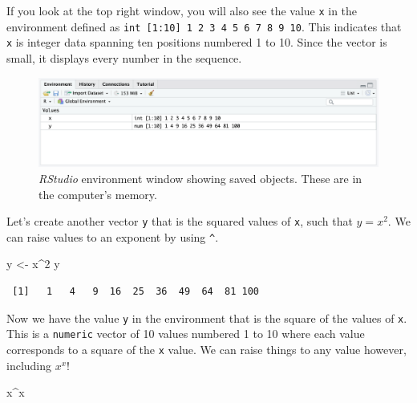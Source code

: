 \documentclass[
  letterpaper,
  DIV=11,
  numbers=noendperiod]{scrreprt}
\newenvironment{Shaded}{\begin{snugshade}}{\end{snugshade}}
\newcommand{\DecValTok}[1]{\textcolor[rgb]{0.68,0.00,0.00}{#1}}
\newcommand{\NormalTok}[1]{\textcolor[rgb]{0.00,0.23,0.31}{#1}}
\newcommand{\OtherTok}[1]{\textcolor[rgb]{0.00,0.23,0.31}{#1}}
\newcommand{\SpecialCharTok}[1]{\textcolor[rgb]{0.37,0.37,0.37}{#1}}
\begin{document}
If you look at the top right window, you will also see the value
\texttt{x} in the environment defined as
\texttt{int\ {[}1:10{]}\ 1\ 2\ 3\ 4\ 5\ 6\ 7\ 8\ 9\ 10}. This indicates
that \texttt{x} is integer data spanning ten positions numbered 1 to 10.
Since the vector is small, it displays every number in the sequence.

\begin{figure}[H]

{\centering \includegraphics{images/environment.png}

}

\caption{\emph{RStudio} environment window showing saved objects. These
are in the computer's memory.}

\end{figure}%

Let's create another vector \texttt{y} that is the squared values of
\texttt{x}, such that \(y=x^2\). We can raise values to an exponent by
using \texttt{\^{}}.

\begin{Shaded}
\begin{Highlighting}[]
\NormalTok{y }\OtherTok{\textless{}{-}}\NormalTok{ x}\SpecialCharTok{\^{}}\DecValTok{2}
\NormalTok{y}
\end{Highlighting}
\end{Shaded}

\begin{verbatim}
 [1]   1   4   9  16  25  36  49  64  81 100
\end{verbatim}

Now we have the value \texttt{y} in the environment that is the square
of the values of \texttt{x}. This is a \texttt{numeric} vector of 10
values numbered 1 to 10 where each value corresponds to a square of the
\texttt{x} value. We can raise things to any value however, including
\(x^x\)!

\begin{Shaded}
\begin{Highlighting}[]
\NormalTok{x}\SpecialCharTok{\^{}}\NormalTok{x}
\end{Highlighting}
\end{Shaded}
\end{document}
